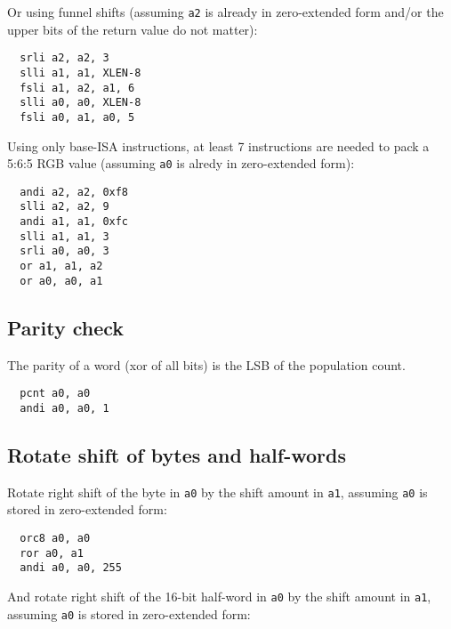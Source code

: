 Or using funnel shifts (assuming {\tt a2} is already in zero-extended form
and/or the upper bits of the return value do not matter):

\begin{minipage}{\linewidth}
\begin{verbatim}
  srli a2, a2, 3
  slli a1, a1, XLEN-8
  fsli a1, a2, a1, 6
  slli a0, a0, XLEN-8
  fsli a0, a1, a0, 5
\end{verbatim}
\end{minipage}

Using only base-ISA instructions, at least 7 instructions are needed to pack a
5:6:5 RGB value (assuming {\tt a0} is alredy in zero-extended form):

\begin{minipage}{\linewidth}
\begin{verbatim}
  andi a2, a2, 0xf8
  slli a2, a2, 9
  andi a1, a1, 0xfc
  slli a1, a1, 3
  srli a0, a0, 3
  or a1, a1, a2
  or a0, a0, a1
\end{verbatim}
\end{minipage}


\subsection{Parity check}

The parity of a word (xor of all bits) is the LSB of the population count.

\begin{verbatim}
  pcnt a0, a0
  andi a0, a0, 1
\end{verbatim}


\subsection{Rotate shift of bytes and half-words}

Rotate right shift of the byte in {\tt a0} by the shift amount in {\tt a1},
assuming {\tt a0} is stored in zero-extended form:

\begin{verbatim}
  orc8 a0, a0
  ror a0, a1
  andi a0, a0, 255
\end{verbatim}

And rotate right shift of the 16-bit half-word in {\tt a0} by the shift amount in {\tt a1},
assuming {\tt a0} is stored in zero-extended form:

